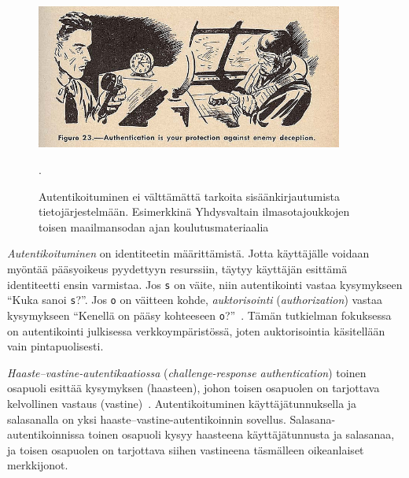 \documentclass[finnish,gradu]{tktltiki}
\begin{document}
  \begin{figure}[h!]
    \centering
    \includegraphics[width=0.9\textwidth]{images/usnavy_authentication.jpg}
    \caption{Autentikoituminen ei välttämättä tarkoita sisäänkirjautumista tietojärjestelmään. Esimerkkinä Yhdysvaltain ilmasotajoukkojen toisen maailmansodan ajan koulutusmateriaalia~\cite{usnavy_authentication}}.
    \label{fig:autentikointi_suojaa_viholliselta}
  \end{figure}


  \emph{Autentikoituminen} on identiteetin määrittämistä. Jotta käyttäjälle voidaan myöntää pääsyoikeus pyydettyyn resurssiin, täytyy käyttäjän esittämä identiteetti ensin varmistaa. Jos \verb#s# on väite, niin autentikointi vastaa kysymykseen ``Kuka sanoi \verb#s#?''. Jos \verb#o# on väitteen kohde, \emph{auktorisointi} (\emph{authorization}) vastaa kysymykseen ``Kenellä on pääsy kohteeseen \verb#o#?''~\cite{lampson_distributed_1992}. Tämän tutkielman fokuksessa on autentikointi julkisessa verkkoympäristössä, joten auktorisointia käsitellään vain pintapuolisesti.

  \emph{Haaste--vastine-autentikaatiossa} (\emph{challenge-response authentication}) toinen osapuoli esittää kysymyksen (haasteen), johon toisen osapuolen on tarjottava kelvollinen vastaus (vastine)~\cite{NIST_SP800-63-1}. Autentikoituminen käyttäjätunnuksella ja salasanalla on yksi haaste--vastine-autentikoinnin sovellus. Salasana-autentikoinnissa toinen osapuoli kysyy haasteena käyttäjätunnusta ja salasanaa, ja toisen osapuolen on tarjottava siihen vastineena täsmälleen oikeanlaiset merkkijonot.


\end{document}
